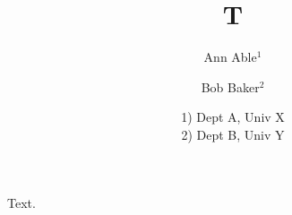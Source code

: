 \documentclass{article}
\author{Ann Able$^1$ \and Bob Baker$^2$}
\title{T}
\date{1) Dept A, Univ X\\ 2) Dept B, Univ Y}
\begin{document}
\maketitle
Text.
\end{document}
